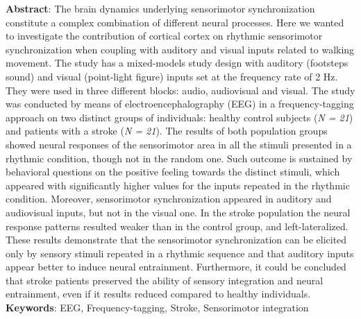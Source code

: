 \documentclass[a4paper, twoside, openright]{book}
\begin{document}


\cleardoublepage
\newpage 
\thispagestyle{empty}
\begin{flushleft}
  \vspace*{15em}
  \justify
  \textbf{Abstract}: The brain dynamics underlying sensorimotor synchronization constitute a complex combination of different neural processes. Here we wanted to investigate the contribution of cortical cortex on rhythmic sensorimotor synchronization when coupling with auditory and visual inputs related to walking movement. The study has a mixed-models study design with auditory (footsteps sound) and visual (point-light figure) inputs set at the frequency rate of 2 Hz. They were used in three different blocks: audio, audiovisual and visual. The study was conducted by means of electroencephalography (EEG) in a frequency-tagging approach on two distinct groups of individuals: healthy control subjects (\textit{N = 21}) and patients with a stroke (\textit{N = 21}). The results of both population groups showed neural responses of the sensorimotor area in all the stimuli presented in a rhythmic condition, though not in the random one. Such outcome is sustained by behavioral questions on the positive feeling towards the distinct stimuli, which appeared with significantly higher values for the inputs repeated in the rhythmic condition. Moreover, sensorimotor synchronization appeared in auditory and audiovisual inputs, but not in the visual one. In the stroke population the neural response patterns resulted weaker than in the control group, and left-lateralized. These results demonstrate that the sensorimotor synchronization can be elicited only by sensory stimuli repeated in a rhythmic sequence and that auditory inputs appear better to induce neural entrainment. Furthermore, it could be concluded that stroke patients preserved the ability of sensory integration and neural entrainment, even if it results reduced compared to healthy individuals. 
  \vspace*{3em}
  \justify
  \textbf{Keywords}: EEG, Frequency-tagging, Stroke, Sensorimotor integration
\end{flushleft}

\tableofcontents













\begin{appendices}

\end{appendices}

\printbibliography[heading=bibintoc]
\end{document}
